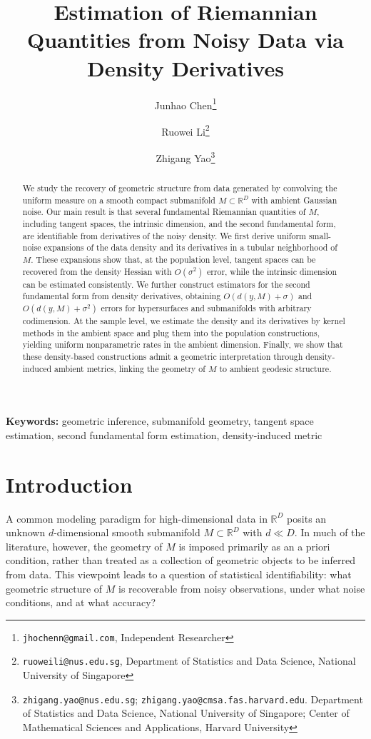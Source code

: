 \documentclass[11pt]{article}
\title{Estimation of Riemannian Quantities from Noisy Data via Density Derivatives}
\author{
Junhao Chen\thanks{\texttt{jhochenn@gmail.com}, Independent Researcher}
\and
Ruowei Li\thanks{\texttt{ruoweili@nus.edu.sg}, Department of Statistics and Data Science, National University of Singapore}
\and
Zhigang Yao\thanks{\texttt{zhigang.yao@nus.edu.sg}; \texttt{zhigang.yao@cmsa.fas.harvard.edu}. Department of Statistics and Data Science, National University of Singapore; Center of Mathematical Sciences and Applications, Harvard University}
}
\date{}
\theoremstyle{plain}
\theoremstyle{definition}
\begin{document}
\maketitle

\begin{abstract}%
    We study the recovery of geometric structure from data generated by convolving the uniform measure on a smooth compact submanifold $M\subset\mathbb{R}^D$ with ambient Gaussian noise. Our main result is that several fundamental Riemannian quantities of $M$, including tangent spaces, the intrinsic dimension, and the second fundamental form, are identifiable from derivatives of the noisy density.
    We first derive uniform small-noise expansions of the data density and its derivatives in a tubular neighborhood of $M$. These expansions show that, at the population level, tangent spaces can be recovered from the density Hessian with $O(\sigma^2)$ error, while the intrinsic dimension can be estimated consistently. We further construct estimators for the second fundamental form from density derivatives, obtaining $O(d(y,M)+\sigma)$ and $O(d(y,M)+\sigma^2)$ errors for hypersurfaces and submanifolds with arbitrary codimension.
    At the sample level, we estimate the density and its derivatives by kernel methods in the ambient space and plug them into the population constructions, yielding uniform nonparametric rates in the ambient dimension.
    Finally, we show that these density-based constructions admit a geometric interpretation through density-induced ambient metrics, linking the geometry of $M$ to ambient geodesic structure.
\end{abstract}

\noindent\textbf{Keywords:}
geometric inference, submanifold geometry, tangent space estimation, second fundamental form estimation, density-induced metric

\section{Introduction} 
A common modeling paradigm for high-dimensional data in $\mathbb{R}^D$ posits an unknown $d$-dimensional smooth submanifold $M \subset\mathbb{R}^D$ with $d \ll D$. 
In much of the literature, however, the geometry of $M$ is imposed primarily as an a priori condition, rather than treated as a collection of geometric objects to be inferred from data. This viewpoint leads to a question of statistical identifiability: what geometric structure of $M$ is recoverable from noisy observations, under what noise conditions, and at what accuracy?
\end{document}
